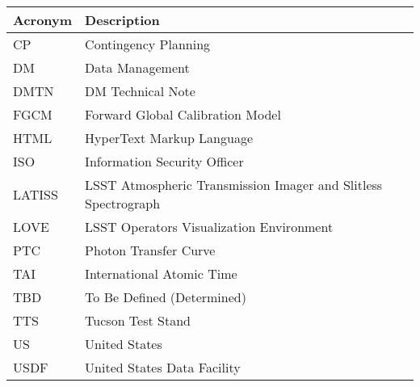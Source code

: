 \addtocounter{table}{-1}
\begin{longtable}{p{}p{}}\hline
\textbf{Acronym} & \textbf{Description}  \\\hline

CP & Contingency Planning \\\hline
DM & Data Management \\\hline
DMTN & DM Technical Note \\\hline
FGCM & Forward Global Calibration Model \\\hline
HTML & HyperText Markup Language \\\hline
ISO & Information Security Officer \\\hline
LATISS & LSST Atmospheric Transmission Imager and Slitless Spectrograph \\\hline
LOVE & LSST Operators Visualization Environment \\\hline
PTC & Photon Transfer Curve \\\hline
TAI & International Atomic Time \\\hline
TBD & To Be Defined (Determined) \\\hline
TTS & Tucson Test Stand \\\hline
US & United States \\\hline
USDF & United States Data Facility \\\hline
\end{longtable}

